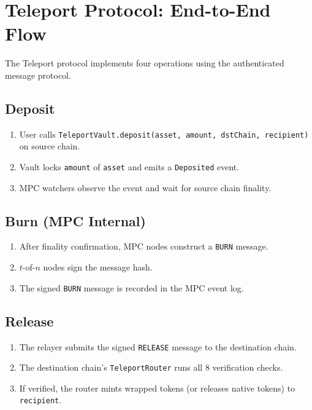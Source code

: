 \section{Teleport Protocol: End-to-End Flow}


The Teleport protocol implements four operations using the authenticated message protocol.

\subsection{Deposit}

\begin{enumerate}[leftmargin=2em]
\item User calls \texttt{TeleportVault.deposit(asset, amount, dstChain, recipient)} on source chain.
\item Vault locks \texttt{amount} of \texttt{asset} and emits a \texttt{Deposited} event.
\item MPC watchers observe the event and wait for source chain finality.
\end{enumerate}

\subsection{Burn (MPC Internal)}

\begin{enumerate}[leftmargin=2em]
\item After finality confirmation, MPC nodes construct a \texttt{BURN} message.
\item $t$-of-$n$ nodes sign the message hash.
\item The signed \texttt{BURN} message is recorded in the MPC event log.
\end{enumerate}

\subsection{Release}

\begin{enumerate}[leftmargin=2em]
\item The relayer submits the signed \texttt{RELEASE} message to the destination chain.
\item The destination chain's \texttt{TeleportRouter} runs all 8 verification checks.
\item If verified, the router mints wrapped tokens (or releases native tokens) to \texttt{recipient}.
\end{enumerate}


